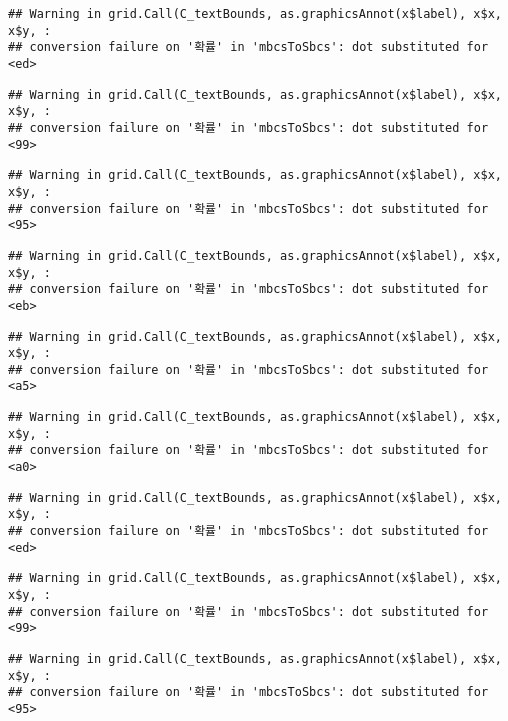 \documentclass[]{book}
\begin{document}
\begin{verbatim}
## Warning in grid.Call(C_textBounds, as.graphicsAnnot(x$label), x$x, x$y, :
## conversion failure on '확률' in 'mbcsToSbcs': dot substituted for <ed>
\end{verbatim}

\begin{verbatim}
## Warning in grid.Call(C_textBounds, as.graphicsAnnot(x$label), x$x, x$y, :
## conversion failure on '확률' in 'mbcsToSbcs': dot substituted for <99>
\end{verbatim}

\begin{verbatim}
## Warning in grid.Call(C_textBounds, as.graphicsAnnot(x$label), x$x, x$y, :
## conversion failure on '확률' in 'mbcsToSbcs': dot substituted for <95>
\end{verbatim}

\begin{verbatim}
## Warning in grid.Call(C_textBounds, as.graphicsAnnot(x$label), x$x, x$y, :
## conversion failure on '확률' in 'mbcsToSbcs': dot substituted for <eb>
\end{verbatim}

\begin{verbatim}
## Warning in grid.Call(C_textBounds, as.graphicsAnnot(x$label), x$x, x$y, :
## conversion failure on '확률' in 'mbcsToSbcs': dot substituted for <a5>
\end{verbatim}

\begin{verbatim}
## Warning in grid.Call(C_textBounds, as.graphicsAnnot(x$label), x$x, x$y, :
## conversion failure on '확률' in 'mbcsToSbcs': dot substituted for <a0>
\end{verbatim}

\begin{verbatim}
## Warning in grid.Call(C_textBounds, as.graphicsAnnot(x$label), x$x, x$y, :
## conversion failure on '확률' in 'mbcsToSbcs': dot substituted for <ed>
\end{verbatim}

\begin{verbatim}
## Warning in grid.Call(C_textBounds, as.graphicsAnnot(x$label), x$x, x$y, :
## conversion failure on '확률' in 'mbcsToSbcs': dot substituted for <99>
\end{verbatim}

\begin{verbatim}
## Warning in grid.Call(C_textBounds, as.graphicsAnnot(x$label), x$x, x$y, :
## conversion failure on '확률' in 'mbcsToSbcs': dot substituted for <95>
\end{verbatim}
\end{document}
